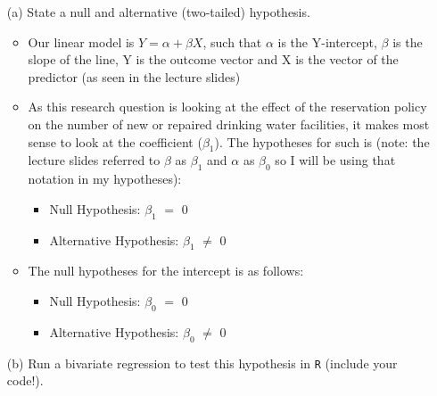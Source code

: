 \documentclass[12pt,letterpaper]{article}
\begin{document}
\newpage
\begin{enumerate}
	\item [(a)] State a null and alternative (two-tailed) hypothesis. 
	
		\begin{itemize}
			\item Our linear model is $Y = \alpha + \beta X$, such that $\alpha$ is the Y-intercept, $\beta$ is the slope of the line, Y is the outcome vector and X is the vector of the predictor (as seen in the lecture slides)
			\item As this research question is looking at the effect of the reservation policy on the number of new or repaired drinking water facilities, it makes most sense to look at the coefficient ($\beta_1$). The hypotheses for such is (note: the lecture slides referred to $\beta$ as $\beta_1$ and $\alpha$ as $\beta_0$ so I will be using that notation in my hypotheses):
				\begin{itemize}
					\item {Null Hypothesis: $\beta_1$ $=$ 0}
					\item {Alternative Hypothesis: $\beta_1$ $\neq$ 0}
				\end{itemize}
			\item The null hypotheses for the intercept is as follows:
				\begin{itemize}
					\item {Null Hypothesis: $\beta_0$ $=$ 0}
					\item {Alternative Hypothesis: $\beta_0$ $\neq$ 0}
				\end{itemize}
		\end{itemize}
	
	\vspace{0cm}
	\item [(b)] Run a bivariate regression to test this hypothesis in \texttt{R} (include your code!).
			

\end{enumerate}
\end{document}
